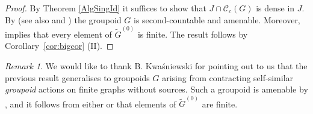 \documentclass[11pt, oneside, reqno]{amsart}
\newcommand{\cg}{\mathscr{C}_c(G)}
\newcommand{\tiGu}{\tilde{G}^{(0)}}
\theoremstyle{definition}
\theoremstyle{remark}
\newtheorem{rmk}[thm]{Remark}
\numberwithin{equation}{section}
\begin{document}
\begin{proof}
    By Theorem \ref{AlgSingId} it suffices to show that $J \cap \cg$ is dense in $J$. By \cite[Corollary~2.19]{MilSte25} (see also \cite{Nek09} and \cite{GNSV}) the groupoid $G$ is second-countable and amenable. Moreover, \cite[Corollary~7.13]{BGHL} implies that every element of $\tiGu$ is finite. The result follows by Corollary~\ref{cor:bigcor} (II).
\end{proof}

\begin{rmk}
    We would like to thank B. Kwaśniewski for pointing out to us that the previous result generalises to groupoids $G$ arising from contracting self-similar \emph{groupoid} actions on finite graphs without sources. Such a groupoid is amenable by \cite[Corollary~2.19]{MilSte25}, and it follows from either \cite[Corollary~6.23]{KM25} or \cite[Proposition~9.1]{Aakre} that elements of $\tiGu$ are finite.
\end{rmk}
\end{document}
